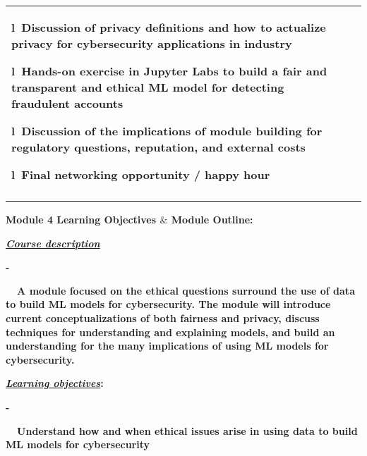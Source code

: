 \documentclass[12pt]{article}
\renewcommand{\_}{\kern-1.5pt\textunderscore\kern-1.5pt}
\begin{document}
\begin{table}[H]
\begin{tabular}{p{1.22in}p{4.87in}}
\multicolumn{1}{p{4.87in}}{\textbf{l}{\fontsize{7pt}{8.4pt}\selectfont \textbf{\  Discussion of privacy definitions and how to actualize privacy for cybersecurity applications in industry}} \par \textbf{l}{\fontsize{7pt}{8.4pt}\selectfont \textbf{\  Hands-on exercise in Jupyter Labs to build a fair and transparent and ethical ML model for detecting fraudulent accounts}} \par \textbf{l}{\fontsize{7pt}{8.4pt}\selectfont \textbf{\  Discussion of the implications of module building for regulatory questions, reputation, and external costs}} \par \textbf{l}{\fontsize{7pt}{8.4pt}\selectfont \textbf{\  Final networking opportunity / happy hour}}} \\
\hhline{~~}

\end{tabular}
\end{table}


\textbf{Module 4 Learning Objectives $\&$  Module Outline:}\par

\textbf{ }\par

\textbf{\textit{\uline{Course description}}}\par

\begin{adjustwidth}{0.5in}{0.0in}
\textbf{-}{\fontsize{7pt}{8.4pt}\selectfont \textbf{\ \  \tab A module focused on the ethical questions surround the use of data to build ML models for cybersecurity. The module will introduce current conceptualizations of both fairness and privacy, discuss techniques for understanding and explaining models, and build an understanding for the many implications of using ML models for cybersecurity.}\par}\par

\end{adjustwidth}

\textbf{ }\par

\textbf{\textit{\uline{Learning objectives}}:}\par

\begin{adjustwidth}{0.5in}{0.0in}
\textbf{-}{\fontsize{7pt}{8.4pt}\selectfont \textbf{\ \  \tab Understand how and when ethical issues arise in using data to build ML models for cybersecurity}\par}\par

\end{adjustwidth}
\end{document}

